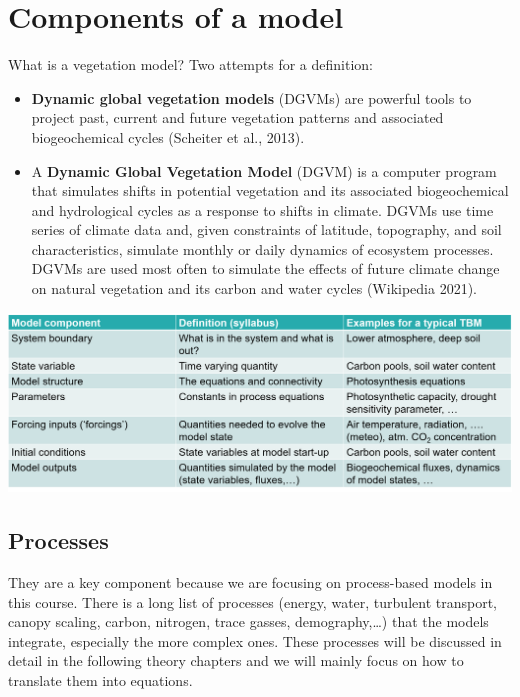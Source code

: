 \documentclass[
  12pt,
  oneside]{book}
\providecommand{\tightlist}{%
  \setlength{\itemsep}{0pt}\setlength{\parskip}{0pt}}
\begin{document}
\hypertarget{components-of-a-model}{%
\section{Components of a model}\label{components-of-a-model}}

What is a vegetation model?
Two attempts for a definition:

\begin{itemize}
\tightlist
\item
  \textbf{Dynamic global vegetation models} (DGVMs) are powerful tools to project past, current and future vegetation patterns and associated biogeochemical cycles (Scheiter et al., 2013).
\item
  A \textbf{Dynamic Global Vegetation Model} (DGVM) is a computer program that simulates shifts in potential vegetation and its associated biogeochemical and hydrological cycles as a response to shifts in climate. DGVMs use time series of climate data and, given constraints of latitude, topography, and soil characteristics, simulate monthly or daily dynamics of ecosystem processes. DGVMs are used most often to simulate the effects of future climate change on natural vegetation and its carbon and water cycles (Wikipedia 2021).
\end{itemize}

\begin{center}
\label{table:components}

\begin{center}\includegraphics[width=0.9\linewidth]{figures/chap1/table_components} \end{center}
\end{center}

\hypertarget{processes}{%
\subsection{Processes}\label{processes}}

They are a key component because we are focusing on process-based models in this course. There is a long list of processes (energy, water, turbulent transport, canopy scaling, carbon, nitrogen, trace gasses, demography,\ldots) that the models integrate, especially the more complex ones. These processes will be discussed in detail in the following theory chapters and we will mainly focus on how to translate them into equations.
\end{document}
